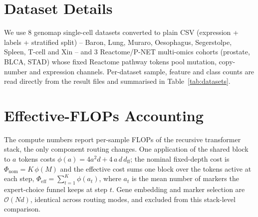 \documentclass[letterpaper]{article}
\begin{document}
\section{Dataset Details}
\label{app:data}
We use $8$ genomap single-cell datasets \cite{islam2023cartography} converted to
plain CSV (expression + labels + stratified split) -- Baron, Lung, Muraro, Oesophagus,
Segerstolpe, Spleen, T-cell and Xin -- and $3$ Reactome/P-NET multi-omics
cohorts (prostate, BLCA, STAD) whose fixed Reactome pathway tokens pool mutation,
copy-number and expression channels. Per-dataset sample, feature and class counts are
read directly from the result files and summarised in Table~\ref{tab:datasets}.

\begin{table}[h]
\centering
{}
\caption{The 11 datasets used throughout: $8$ genomap single-cell suites
and $3$ Reactome/P-NET multi-omics cohorts. Counts are read directly from the
result files.}
\label{tab:datasets}
\end{table}

\section{Effective-FLOPs Accounting}
\label{app:flops}
The compute numbers report per-sample FLOPs of the recursive transformer stack, the
only component routing changes. One application of the shared block to $a$ tokens costs
$\phi(a)=4a^2 d + 4\,a\,d\,d_{\mathrm{ff}}$; the nominal fixed-depth cost is
$\Phi_{\mathrm{nom}}=K\,\phi(M)$ and the effective cost sums one block over the tokens
active at each step, $\Phi_{\mathrm{eff}}=\sum_{t=1}^{K}\phi(a_t)$, where $a_t$ is the
mean number of markers the expert-choice funnel keeps at step $t$. Gene embedding and
marker selection are $\mathcal{O}(Nd)$, identical across routing modes, and excluded
from this stack-level comparison.
\end{document}
